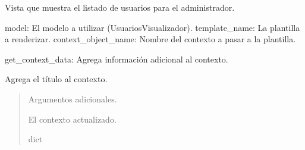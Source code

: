 \documentclass[letterpaper,10pt,spanish]{sphinxmanual}
\begin{document}
\begin{fulllineitems}

\pysigstartsignatures
{}
\pysigstopsignatures
\sphinxAtStartPar
Vista que muestra el listado de usuarios para el administrador.
\begin{description}
\sphinxAtStartPar
model: El modelo a utilizar (UsuariosVisualizador).
template\_name: La plantilla a renderizar.
context\_object\_name: Nombre del contexto a pasar a la plantilla.

\sphinxAtStartPar
get\_context\_data: Agrega información adicional al contexto.

\end{description}


\begin{fulllineitems}

\pysigstartsignatures
{}
\pysigstopsignatures
\end{fulllineitems}



\begin{fulllineitems}

\pysigstartsignatures
{}
\pysigstopsignatures
\sphinxAtStartPar
Agrega el título al contexto.
\begin{quote}\begin{description}
\sphinxAtStartPar
{} \textendash{} Argumentos adicionales.

\sphinxAtStartPar
El contexto actualizado.

\sphinxAtStartPar
dict

\end{description}\end{quote}

\end{fulllineitems}




\end{fulllineitems}
\end{document}
